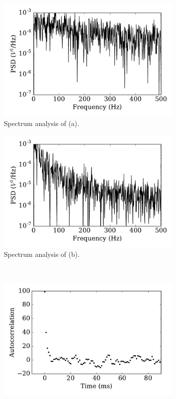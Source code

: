\begin{figure}[tbp!]
		\begin{subfigure}[t]{0.43\textwidth}
			\includegraphics[width=\textwidth]{pics_iconip/psd_tau1.pdf}
			\caption{Spectrum analysis of (a).}
		\end{subfigure}
		\begin{subfigure}[t]{0.43\textwidth}
			\includegraphics[width=\textwidth]{pics_iconip/psd_tau10.pdf}
			\caption{Spectrum analysis of (b).}
		\end{subfigure}\\
		\begin{subfigure}[t]{0.43\textwidth}
			\includegraphics[width=\textwidth]{pics_iconip/autocorr_tau1.pdf}

\end{subfigure}
\end{figure}
